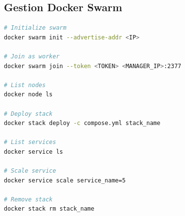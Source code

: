 \documentclass[12pt,a4paper]{article}
\begin{document}
\subsection{Gestion Docker Swarm}

\begin{lstlisting}[language=bash, caption=Commandes Swarm]
# Initialize swarm
docker swarm init --advertise-addr <IP>

# Join as worker
docker swarm join --token <TOKEN> <MANAGER_IP>:2377

# List nodes
docker node ls

# Deploy stack
docker stack deploy -c compose.yml stack_name

# List services
docker service ls

# Scale service
docker service scale service_name=5

# Remove stack
docker stack rm stack_name
\end{lstlisting}
\end{document}
